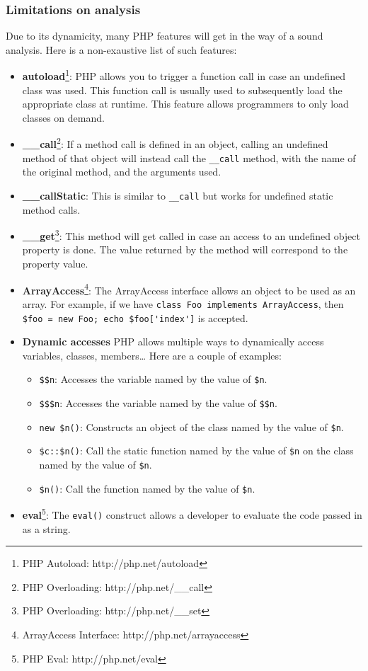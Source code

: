 \documentclass[a4paper]{article}
\begin{document}
\subsubsection{Limitations on analysis}
Due to its dynamicity, many PHP features will get in the way of a sound analysis.
Here is a non-exaustive list of such features:
\begin{itemize}
  \item \textbf{autoload}\footnote{PHP Autoload: http://php.net/autoload}:
    PHP allows you to trigger a function call in case an undefined class was
    used.  This function call is usually used to subsequently load the
    appropriate class at runtime. This feature allows programmers to only load
    classes on demand.
  \item \textbf{\_\_call}\footnote{PHP Overloading: http://php.net/\_\_call}:
    If a method call is defined in an object, calling an undefined method of
    that object will instead call the \verb&__call& method, with the name of
    the original method, and the arguments used.
  \item \textbf{\_\_callStatic}:
    This is similar to \verb&__call& but works for undefined static method
    calls.
  \item \textbf{\_\_get}\footnote{PHP Overloading: http://php.net/\_\_set}:
    This method will get called in case an access to an undefined object
    property is done. The value returned by the method will correspond to the
    property value.
  \item \textbf{ArrayAccess}\footnote{ArrayAccess Interface: http://php.net/arrayaccess}:
    The ArrayAccess interface allows an object to be used as an array. For example,
    if we have \verb&class Foo implements ArrayAccess&, then
    \verb&$foo = new Foo; echo $foo['index']& is accepted.
  \item \textbf{Dynamic accesses}
    PHP allows multiple ways to dynamically access variables, classes, members\ldots
    Here are a couple of examples:
    \begin{itemize}
      \item \verb/$$n/:
        Accesses the variable named by the value of \verb/$n/.
      \item \verb/$$$n/:
        Accesses the variable named by the value of \verb/$$n/.
      \item \verb/new $n()/:
        Constructs an object of the class named by the value of \verb/$n/.
      \item \verb/$c::$n()/:
        Call the static function named by the value of \verb/$n/ on the class
        named by the value of \verb/$n/.
      \item \verb/$n()/:
        Call the function named by the value of \verb/$n/.
    \end{itemize}
  \item \textbf{eval}\footnote{PHP Eval: http://php.net/eval}:
    The \verb&eval()& construct allows a developer to evaluate the code passed in as a string.
\end{itemize}
\end{document}

